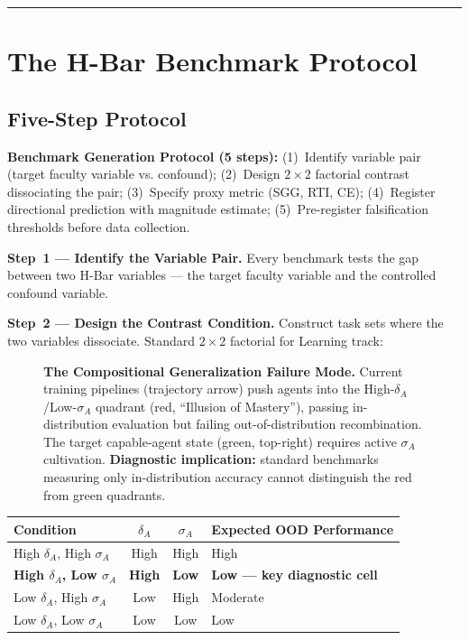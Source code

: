\documentclass[11pt,a4paper]{article}
\begin{document}
\noindent\rule{\linewidth}{0.4pt}

\section{The H-Bar Benchmark Protocol}\label{sec:benchmark-protocol}

\subsection{Five-Step Protocol}\label{sec:five-step}

\textbf{Benchmark Generation Protocol (5 steps):}
(1)~Identify variable pair (target faculty variable vs. confound);
(2)~Design $2{\times}2$ factorial contrast dissociating the pair;
(3)~Specify proxy metric (SGG, RTI, CE);
(4)~Register directional prediction with magnitude estimate;
(5)~Pre-register falsification thresholds before data collection.

\textbf{Step~1 --- Identify the Variable Pair.} Every benchmark tests
the gap between two H-Bar variables --- the target faculty variable and
the controlled confound variable.

\textbf{Step~2 --- Design the Contrast Condition.} Construct task sets
where the two variables dissociate. Standard $2\times 2$ factorial for
Learning track:

\begin{figure}[htbp]
\centering
\resizebox{0.7\textwidth}{!}{}
\caption{\textbf{The Compositional Generalization Failure Mode.} Current
training pipelines (trajectory arrow) push agents into the
High-$\delta_A$/Low-$\sigma_A$ quadrant (red, ``Illusion of Mastery''),
passing in-distribution evaluation but failing out-of-distribution
recombination. The target capable-agent state (green, top-right) requires
active $\sigma_A$ cultivation. \textbf{Diagnostic implication:} standard
benchmarks measuring only in-distribution accuracy cannot distinguish
the red from green quadrants.}
\label{fig:diagnostic}
\end{figure}

\begin{center}
\begin{tabular}{>{\raggedright}p{4cm} c c >{\raggedright\arraybackslash}p{5cm}}
\toprule
\textbf{Condition} & $\delta_A$ & $\sigma_A$ & \textbf{Expected OOD Performance} \\
\midrule
High $\delta_A$, High $\sigma_A$ & High & High & High \\
\textbf{High $\delta_A$, Low $\sigma_A$} & \textbf{High} & \textbf{Low} & \textbf{Low --- key diagnostic cell} \\
Low $\delta_A$, High $\sigma_A$ & Low & High & Moderate \\
Low $\delta_A$, Low $\sigma_A$ & Low & Low & Low \\
\bottomrule
\end{tabular}
\end{center}
\end{document}
